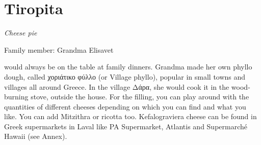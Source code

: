 \chapter{Tiropita}
\label{ch:tiropita}


\textit{Cheese pie}

Family member: Grandma Elisavet

 would always be on the table at family dinners. Grandma made her own phyllo dough, called \textgreek{χοριάτικο φύλλο} (or Village phyllo), popular in small towns and villages all around Greece. In the village \textgreek{Δάρα}, she would cook it in the wood-burning stove, outside the house. For the filling, you can play around with the quantities of different cheeses depending on which you can find and what you like. You can add Mitzithra or ricotta too. Kefalograviera cheese can be found in Greek supermarkets in Laval like PA Supermarket, Atlantis and Supermarché Hawaii (see Annex).  %

